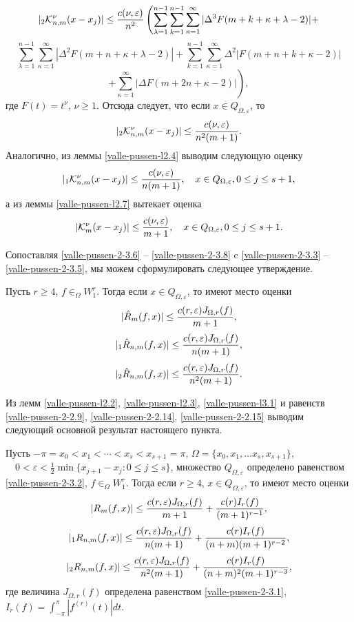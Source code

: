 $$
|_2\mathcal{ K}_{n,m}^{\nu}(x-x_j)|\le{c(\nu,\varepsilon)\over n^2}
\left(\sum\limits_{\lambda=1}^{n-1}\sum_{k=1}^{n-1}
\sum\limits_{\kappa=1}^{\infty}|\Delta^3F(m+k+\kappa+\lambda-2)|+\right.
$$
$$
 \sum\limits_{\lambda=1}^{n-1}
\sum\limits_{\kappa=1}^{\infty}|\Delta^2F(m+n+\kappa+\lambda-2)|
 +\sum_{k=1}^{n-1}
\sum\limits_{\kappa=1}^{\infty}\Delta^2|F(m+n+k+\kappa-2)|
$$
$$
 \left.+\sum\limits_{\kappa=1}^{\infty}|\Delta F(m+2n+\kappa-2)|\right),
$$
где $F(t)=t^\nu $, $\nu\ge1$. Отсюда следует, что если $x\in Q_{\Omega,\varepsilon}$, то
\begin{equation}\label{valle-pussen-2-3.6}
|_2\mathcal{ K}_{n,m}^{\nu}(x-x_j)|\le{c(\nu,\varepsilon)\over n^2(m+1)}.
\end{equation}
Аналогично, из леммы \ref{valle-pussen-l2.4}  выводим следующую оценку
\begin{equation}\label{valle-pussen-2-3.7}
|_1\mathcal{ K}_{n,m}^{\nu}(x-x_j)|\le{c(\nu,\varepsilon)\over n(m+1)}, \quad x\in Q_{\Omega,\varepsilon}, 0\le j\le s+1,
\end{equation}
а из леммы \ref{valle-pussen-l2.7}  вытекает оценка
\begin{equation}\label{valle-pussen-2-3.8}
|\mathcal{ K}_{m}^{\nu}(x-x_j)|\le{c(\nu,\varepsilon)\over m+1}, \quad x\in Q_{\Omega,\varepsilon}, 0\le j\le s+1.
\end{equation}





Сопоставляя \eqref{valle-pussen-2-3.6} -- \eqref{valle-pussen-2-3.8} c \eqref{valle-pussen-2-3.3} -- \eqref{valle-pussen-2-3.5}, мы можем сформулировать следующее утверждение.
\begin{lemma}\label{valle-pussen-l3.1}
Пусть $r \ge4$, $f\in _\Omega W_1^r$. Тогда если $x\in Q_{\Omega,\varepsilon}$, то
имеют место оценки
$$
|\hat R_{m}(f,x)|\le{c(r,\varepsilon)J_{\Omega,r}(f)\over m+1},
$$
$$
|_1\hat R_{n,m}(f,x)|\le{c(r,\varepsilon)J_{\Omega,r}(f)\over n(m+1)},
$$
$$
|_2\hat R_{n,m}(f,x)|\le{c(r,\varepsilon)J_{\Omega,r}(f)\over n^2(m+1)}.
$$
\end{lemma}

Из лемм \ref{valle-pussen-l2.2}, \ref{valle-pussen-l2.3}, \ref{valle-pussen-l3.1} и равенств  \eqref{valle-pussen-2-2.9}, \eqref{valle-pussen-2-2.14},  \eqref{valle-pussen-2-2.15} выводим следующий основной результат настоящего пункта.
\begin{theorem}\label{valle-pussen-t1}
 Пусть $-\pi=x_0<x_1<\cdots<x_s<x_{s+1}=\pi$, $\Omega=\{x_0,x_1,\ldots x_s,x_{s+1}\}$,  $\quad 0<\varepsilon<\frac12\min\{x_{j+1}-x_{j}:0\le j\le s\}$, множество $Q_{\Omega,\varepsilon}$ определено равенством \eqref{valle-pussen-2-3.2},
$f\in _\Omega W_1^r$. Тогда если $r\ge4$, $x\in Q_{\Omega,\varepsilon}$, то
имеют место оценки
$$
|R_{m}(f,x)|\le{c(r,\varepsilon)J_{\Omega,r}(f)\over m+1}+{c(r)I_r(f)\over (m+1)^{r-1}},
$$
$$
|_1R_{n,m}(f,x)|\le{c(r,\varepsilon)J_{\Omega,r}(f)\over n(m+1)}+{c(r)I_r(f)\over (n+m)(m+1)^{r-2}},
$$
$$
|_2R_{n,m}(f,x)|\le{c(r,\varepsilon)J_{\Omega,r}(f)\over n^2(m+1)}+{c(r)I_r(f)\over (n+m)^2(m+1)^{r-3}},
$$
где величина $J_{\Omega,r}(f)$ определена равенством \eqref{valle-pussen-2-3.1},
 $I_r(f)=\int_{-\pi}^{\pi}|f^{(r)}(t)|dt$.
\end{theorem}

